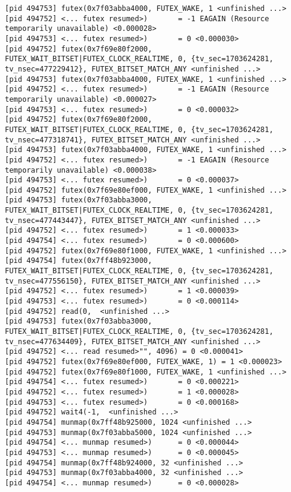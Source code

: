 \documentclass[a4paper, 12pt]{article}
\begin{document}
\begin{lstlisting}
[pid 494753] futex(0x7f03abba4000, FUTEX_WAKE, 1 <unfinished ...>
[pid 494752] <... futex resumed>)       = -1 EAGAIN (Resource temporarily unavailable) <0.000028>
[pid 494753] <... futex resumed>)       = 0 <0.000030>
[pid 494752] futex(0x7f69e80f2000, FUTEX_WAIT_BITSET|FUTEX_CLOCK_REALTIME, 0, {tv_sec=1703624281, tv_nsec=477229412}, FUTEX_BITSET_MATCH_ANY <unfinished ...>
[pid 494753] futex(0x7f03abba4000, FUTEX_WAKE, 1 <unfinished ...>
[pid 494752] <... futex resumed>)       = -1 EAGAIN (Resource temporarily unavailable) <0.000027>
[pid 494753] <... futex resumed>)       = 0 <0.000032>
[pid 494752] futex(0x7f69e80f2000, FUTEX_WAIT_BITSET|FUTEX_CLOCK_REALTIME, 0, {tv_sec=1703624281, tv_nsec=477318741}, FUTEX_BITSET_MATCH_ANY <unfinished ...>
[pid 494753] futex(0x7f03abba4000, FUTEX_WAKE, 1 <unfinished ...>
[pid 494752] <... futex resumed>)       = -1 EAGAIN (Resource temporarily unavailable) <0.000038>
[pid 494753] <... futex resumed>)       = 0 <0.000037>
[pid 494752] futex(0x7f69e80ef000, FUTEX_WAKE, 1 <unfinished ...>
[pid 494753] futex(0x7f03abba3000, FUTEX_WAIT_BITSET|FUTEX_CLOCK_REALTIME, 0, {tv_sec=1703624281, tv_nsec=477443447}, FUTEX_BITSET_MATCH_ANY <unfinished ...>
[pid 494752] <... futex resumed>)       = 1 <0.000033>
[pid 494754] <... futex resumed>)       = 0 <0.000600>
[pid 494752] futex(0x7f69e80f1000, FUTEX_WAKE, 1 <unfinished ...>
[pid 494754] futex(0x7ff48b923000, FUTEX_WAIT_BITSET|FUTEX_CLOCK_REALTIME, 0, {tv_sec=1703624281, tv_nsec=477556150}, FUTEX_BITSET_MATCH_ANY <unfinished ...>
[pid 494752] <... futex resumed>)       = 1 <0.000039>
[pid 494753] <... futex resumed>)       = 0 <0.000114>
[pid 494752] read(0,  <unfinished ...>
[pid 494753] futex(0x7f03abba3000, FUTEX_WAIT_BITSET|FUTEX_CLOCK_REALTIME, 0, {tv_sec=1703624281, tv_nsec=477634409}, FUTEX_BITSET_MATCH_ANY <unfinished ...>
[pid 494752] <... read resumed>"", 4096) = 0 <0.000041>
[pid 494752] futex(0x7f69e80ef000, FUTEX_WAKE, 1) = 1 <0.000023>
[pid 494752] futex(0x7f69e80f1000, FUTEX_WAKE, 1 <unfinished ...>
[pid 494754] <... futex resumed>)       = 0 <0.000221>
[pid 494752] <... futex resumed>)       = 1 <0.000028>
[pid 494753] <... futex resumed>)       = 0 <0.000168>
[pid 494752] wait4(-1,  <unfinished ...>
[pid 494754] munmap(0x7ff48b925000, 1024 <unfinished ...>
[pid 494753] munmap(0x7f03abba5000, 1024 <unfinished ...>
[pid 494754] <... munmap resumed>)      = 0 <0.000044>
[pid 494753] <... munmap resumed>)      = 0 <0.000045>
[pid 494754] munmap(0x7ff48b924000, 32 <unfinished ...>
[pid 494753] munmap(0x7f03abba4000, 32 <unfinished ...>
[pid 494754] <... munmap resumed>)      = 0 <0.000028>

\end{lstlisting}
\end{document}
